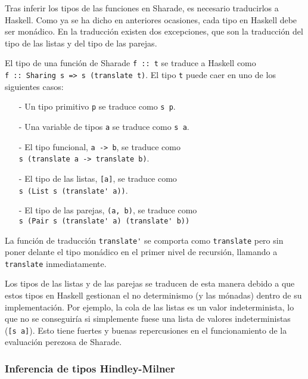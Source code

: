 \documentclass[class=article, crop=false]{standalone}
\begin{document}
Tras inferir los tipos de las funciones en Sharade, es necesario traducirlos a Haskell. Como
ya se ha dicho en anteriores ocasiones, cada tipo en Haskell debe ser monádico. En la
traducción existen dos excepciones, que son la traducción del tipo de las listas y del tipo
de las parejas.

El tipo de una función de Sharade \verb`f :: t` se traduce a Haskell como \\
\verb`f :: Sharing s => s (translate t)`. El tipo \verb`t` puede caer en uno de los
siguientes casos:

\begin{itemize}
  \item[-] Un tipo primitivo \verb`p` se traduce como \verb`s p`.
  \item[-] Una variable de tipos \verb`a` se traduce como \verb`s a`.
  \item[-] El tipo funcional, \verb`a -> b`, se traduce como \\
  \verb`s (translate a -> translate b)`.

  \item[-] El tipo de las listas, \verb`[a]`, se traduce como \\
  \verb`s (List s (translate' a))`.

  \item[-] El tipo de las parejas, \verb`(a, b)`, se traduce como \\
  \verb`s (Pair s (translate' a) (translate' b))`
\end{itemize}

La función de traducción \verb`translate'` se comporta como \verb`translate` pero sin poner
delante el tipo monádico en el primer nivel de recursión, llamando a \verb`translate`
inmediatamente.

Los tipos de las listas y de las parejas se traducen de esta manera debido a que estos tipos
en Haskell gestionan el no determinismo (y las mónadas) dentro de su implementación. Por
ejemplo, la cola de las listas es un valor indeterminista, lo que no se conseguiría si
simplemente fuese una lista de valores indeterministas (\verb`[s a]`). Esto tiene fuertes
y buenas repercusiones en el funcionamiento de la evaluación perezosa de Sharade.

\subsubsection{Inferencia de tipos Hindley-Milner}
\end{document}
